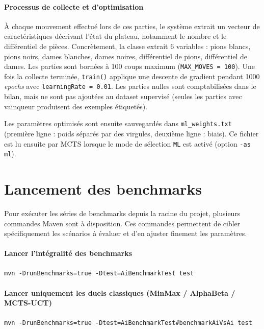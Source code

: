 \documentclass[a4paper]{article}
\begin{document}
\paragraph{Processus de collecte et d'optimisation}
À chaque mouvement effectué lors de ces parties, le système extrait un vecteur de caractéristiques décrivant l'état du plateau, notamment le nombre et le
 différentiel de pièces. Concrètement, la classe extrait 6 variables : pions blancs, pions noirs, dames blanches, dames noires,
 différentiel de pions, différentiel de dames. Les parties sont bornées à 100 coups maximum (\texttt{MAX\_MOVES = 100}).
 Une fois la collecte terminée, \texttt{train()} applique une descente de gradient pendant 1000 \textit{epochs} avec
 \texttt{learningRate = 0.01}. Les parties nulles sont comptabilisées dans le bilan, mais ne sont pas ajoutées au dataset supervisé
 (seules les parties avec vainqueur produisent des exemples étiquetés).

Les paramètres optimisés sont ensuite sauvegardés dans \texttt{ml\_weights.txt}
(première ligne : poids séparés par des virgules, deuxième ligne : biais). Ce fichier est lu ensuite par MCTS lorsque
le mode de sélection \texttt{ML} est activé (option \texttt{-as ml}).

\section{Lancement des benchmarks}
\label{sec:annexe-lancement-benchmarks}

Pour exécuter les séries de benchmarks depuis la racine du projet, plusieurs commandes Maven sont à disposition. Ces commandes 
permettent de cibler spécifiquement les scénarios à évaluer et d'en ajuster finement les paramètres.

\paragraph{Lancer l'intégralité des benchmarks}
\begin{verbatim}
mvn -DrunBenchmarks=true -Dtest=AiBenchmarkTest test
\end{verbatim}

\paragraph{Lancer uniquement les duels classiques (MinMax / AlphaBeta / MCTS-UCT)}
\begin{verbatim}
mvn -DrunBenchmarks=true -Dtest=AiBenchmarkTest#benchmarkAiVsAi test
\end{verbatim}
\end{document}
